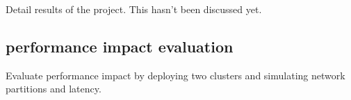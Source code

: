 Detail results of the project. This hasn't been discussed yet.

\subsection{performance impact evaluation}
Evaluate performance impact by deploying two clusters and simulating network partitions and latency.
